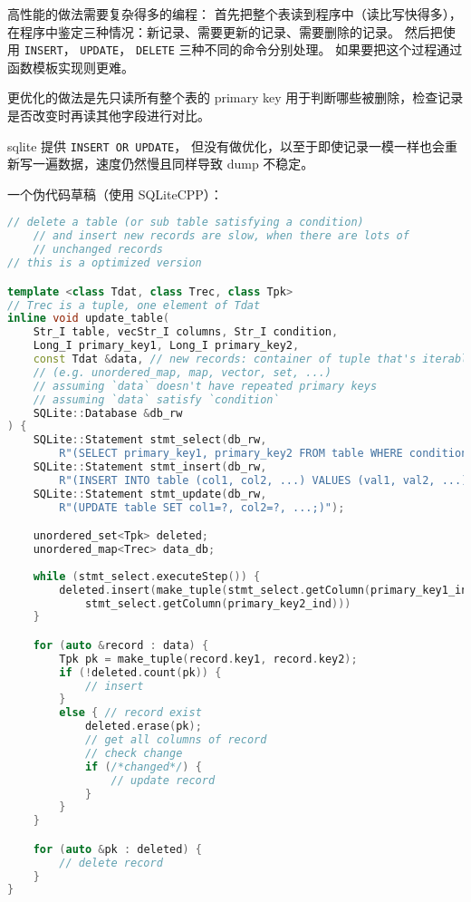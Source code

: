 高性能的做法需要复杂得多的编程： 首先把整个表读到程序中（读比写快得多）， 在程序中鉴定三种情况：新记录、需要更新的记录、需要删除的记录。 然后把使用 \verb`INSERT`， \verb`UPDATE`， \verb`DELETE` 三种不同的命令分别处理。 如果要把这个过程通过函数模板实现则更难。

更优化的做法是先只读所有整个表的 primary key 用于判断哪些被删除，检查记录是否改变时再读其他字段进行对比。

sqlite 提供 \verb`INSERT OR UPDATE`， 但没有做优化，以至于即使记录一模一样也会重新写一遍数据，速度仍然慢且同样导致 dump 不稳定。

一个伪代码草稿（使用 SQLiteCPP）：
\begin{lstlisting}[language=cpp]
// delete a table (or sub table satisfying a condition)
    // and insert new records are slow, when there are lots of
	// unchanged records
// this is a optimized version

template <class Tdat, class Trec, class Tpk>
// Trec is a tuple, one element of Tdat
inline void update_table(
	Str_I table, vecStr_I columns, Str_I condition,
	Long_I primary_key1, Long_I primary_key2,
	const Tdat &data, // new records: container of tuple that's iterable
	// (e.g. unordered_map, map, vector, set, ...)
	// assuming `data` doesn't have repeated primary keys
	// assuming `data` satisfy `condition`
	SQLite::Database &db_rw
) {
	SQLite::Statement stmt_select(db_rw,
		R"(SELECT primary_key1, primary_key2 FROM table WHERE condition;)");
	SQLite::Statement stmt_insert(db_rw,
		R"(INSERT INTO table (col1, col2, ...) VALUES (val1, val2, ...);)");
	SQLite::Statement stmt_update(db_rw,
	    R"(UPDATE table SET col1=?, col2=?, ...;)");

	unordered_set<Tpk> deleted;
	unordered_map<Trec> data_db;
	
	while (stmt_select.executeStep()) {
		deleted.insert(make_tuple(stmt_select.getColumn(primary_key1_ind), 
			stmt_select.getColumn(primary_key2_ind)))
	}

	for (auto &record : data) {
		Tpk pk = make_tuple(record.key1, record.key2);
		if (!deleted.count(pk)) {
			// insert
		}
		else { // record exist
			deleted.erase(pk);
			// get all columns of record
			// check change
			if (/*changed*/) {
				// update record
			}
		}
	}

	for (auto &pk : deleted) {
		// delete record
	}
}
\end{lstlisting}

